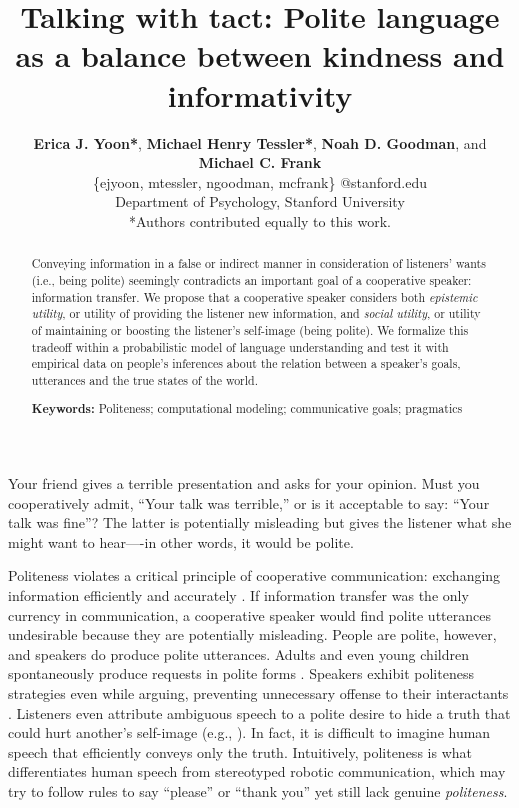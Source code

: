 \documentclass[10pt,letterpaper]{article}
\title{Talking with tact: Polite language as a balance between kindness and informativity}
\author{ {\large \bf Erica J. Yoon*}, {\large \bf Michael Henry Tessler*}, {\large \bf Noah D. Goodman}, and {\large \bf Michael C. Frank}   \\
\{ejyoon, mtessler, ngoodman, mcfrank\} @stanford.edu \\
  Department of Psychology, Stanford University \\
  *Authors contributed equally to this work.}
\begin{document}
\maketitle


\begin{abstract}

Conveying information in a false or indirect manner in consideration of listeners' wants (i.e., being polite)
seemingly contradicts an important goal of a cooperative speaker: information transfer.
We propose that a cooperative speaker considers both
\emph{epistemic utility}, or utility of providing the listener new information,
and \emph{social utility}, or utility of maintaining or boosting the listener's self-image (being polite).
We formalize this tradeoff within a probabilistic model of language understanding and test it with empirical data on people's inferences about the relation between a speaker's goals, utterances and the true states of the world.

\textbf{Keywords:}
Politeness; computational modeling; communicative goals; pragmatics

\end{abstract}


Your friend gives a terrible presentation and asks for your opinion.
Must you cooperatively admit, ``Your talk was terrible,'' or is it acceptable to say: ``Your talk was fine''?
The latter is potentially misleading but gives the listener what she might want to hear----in other words, it would be polite.

Politeness violates a critical principle of cooperative communication: exchanging information efficiently and accurately \cite{Grice1975}.
If information transfer was the only currency in communication, a cooperative speaker would find polite utterances undesirable because they are potentially misleading.
People are polite, however, and speakers do produce polite utterances.
Adults and even young children spontaneously produce requests in polite forms \cite{clark1980, axia1985}.
Speakers exhibit politeness strategies even while arguing, preventing unnecessary offense to their interactants \cite{holtgraves1997}.
Listeners even attribute ambiguous speech to a polite desire to hide a truth that could hurt another's self-image (e.g., ).
In fact, it is difficult to imagine human speech that efficiently conveys only the truth.
Intuitively, politeness is what differentiates human speech from stereotyped robotic communication, 
which may try to follow rules to say ``please'' or ``thank you'' yet still lack genuine \emph{politeness}. 
\end{document}
